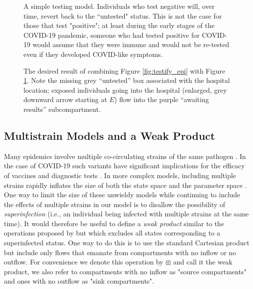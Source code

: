 \begin{figure}
    \centering
    
    \caption{A simple testing model. Individuals who test negative will, over time, revert back to the “untested" status. This is not the case for those that test "positive"; at least during the early stages of the COVID-19 pandemic, someone who had tested positive for COVID-19 would assume that they were immune and would not be re-tested even if they developed COVID-like symptoms.}
    \label{fig:testify_states}
\end{figure}

\begin{figure}
    \centering
    
    \caption{The desired result of combining Figure \ref{fig:testify_epi} with Figure \ref{fig:testify_states}. Note the missing grey ``untested'' box associated with the hospital location; exposed individuals going into the hospital (enlarged, grey downward arrow starting at $E$) flow into the purple ``awaiting results'' subcompartment.}
    \label{fig:testify_desired}
\end{figure}

\FloatBarrier


\subsection{Multistrain Models and a Weak Product}\label{wp}
Many epidemics involve multiple co-circulating strains of the same pathogen \citep{gog2002dynamics, williams2021localization}. In the case of COVID-19 such variants have significant implications for the efficacy of vaccines \citep{abu2021effectiveness, koyama2020emergence} and diagnostic tests \citep{vasireddy2021review}. In more complex models, including multiple strains rapidly inflates the size of both the state space and the parameter space \citep{kryazhimskiy2007state}. One way to limit the size of these unwieldy models while continuing to include the effects of multiple strains in our model is to disallow the possibility of \emph{superinfection} (i.e., an individual being infected with multiple strains at the same time). It would therefore be useful to define a \emph{weak product} similar to the operations proposed by \cite{worden2017products} but which excludes all states corresponding to a superinfected status. One way to do this is to use the standard Cartesian product but include only flows that emanate from compartments with no inflow or no outflow. For convenience we denote this operation by $\boxplus$ and call it the weak product, we also refer to compartments with no inflow as "source compartments" and ones with no outflow as "sink compartments". 

